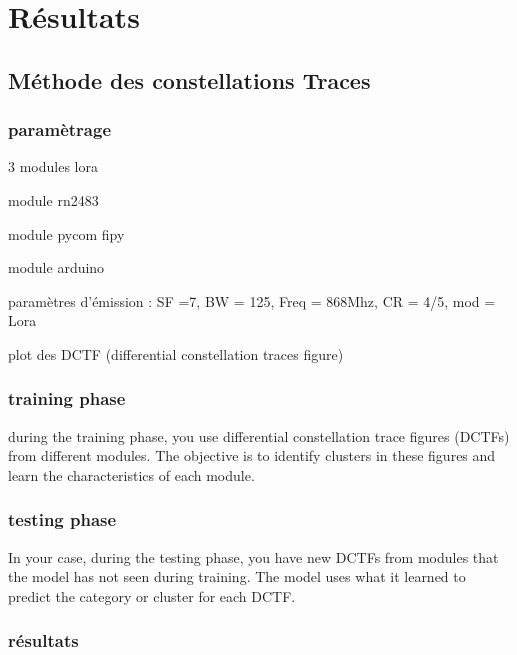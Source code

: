 
\chapter{Résultats}

\section{Méthode des constellations Traces}

\subsection{paramètrage}

3 modules lora

module rn2483

module pycom fipy

module arduino

paramètres d'émission : 
SF =7, BW = 125, Freq = 868Mhz, CR = 4/5, mod = Lora


plot des DCTF (differential constellation traces figure)

\subsection{training phase}

during the training phase, you use differential constellation trace figures (DCTFs) from different modules. The objective is to identify clusters in these figures and learn the characteristics of each module.

\subsection{testing phase}

In your case, during the testing phase, you have new DCTFs from modules that the model has not seen during training. The model uses what it learned to predict the category or cluster for each DCTF.

\subsection{résultats}






